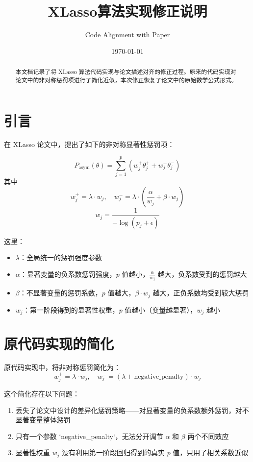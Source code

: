 \documentclass[12pt,a4paper]{article}
\title{XLasso算法实现修正说明}
\author{Code Alignment with Paper}
\date{\today}
\begin{document}
\maketitle

\begin{abstract}
本文档记录了将 XLasso 算法代码实现与论文描述对齐的修正过程。原来的代码实现对论文中的非对称惩罚项进行了简化近似，本次修正恢复了论文中的原始数学公式形式。
\end{abstract}

\section{引言}

在 XLasso 论文中，提出了如下的非对称显著性惩罚项：

\[
P_{\text{asym}}(\theta) = \sum_{j=1}^p \left( w_j^+ \theta_j^+ + w_j^- \theta_j^- \right)
\]
其中
\[
w_j^+ = \lambda \cdot w_j, \quad w_j^- = \lambda \cdot \left( \frac{\alpha}{w_j} + \beta \cdot w_j \right)
\]
\[
w_j = \frac{1}{-\log(p_j + \epsilon)}
\]

这里：
\begin{itemize}
\item $\lambda$：全局统一的惩罚强度参数
\item $\alpha$：显著变量的负系数惩罚强度，$p$ 值越小，$\frac{\alpha}{w_j}$ 越大，负系数受到的惩罚越大
\item $\beta$：不显著变量的惩罚系数，$p$ 值越大，$\beta \cdot w_j$ 越大，正负系数均受到较大惩罚
\item $w_j$：第一阶段得到的显著性权重，$p$ 值越小（变量越显著），$w_j$ 越小
\end{itemize}

\section{原代码实现的简化}

原代码实现中，将非对称惩罚简化为：
\[
w_j^+ = \lambda \cdot w_j, \quad w_j^- = (\lambda + \text{negative\_penalty}) \cdot w_j
\]

这个简化存在以下问题：
\begin{enumerate}
\item 丢失了论文中设计的差异化惩罚策略——对显著变量的负系数额外惩罚，对不显著变量整体惩罚
\item 只有一个参数 `negative\_penalty`，无法分开调节 $\alpha$ 和 $\beta$ 两个不同效应
\item 显著性权重 $w_j$ 没有利用第一阶段回归得到的真实 $p$ 值，只用了相关系数近似
\end{enumerate}
\end{document}
